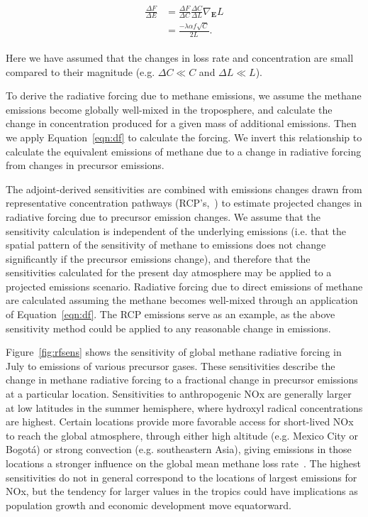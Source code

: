 \begin{equation}
\begin{align}
\begin{split}
\frac{\Delta F}{\Delta E} &= \frac{\Delta F}{\Delta C} \frac{\Delta C}{\Delta L} \nabla_{\mathbf{E}} L \\
                          &= \frac{-\lambda \alpha f \sqrt{C}}{2L}.
\end{split}
\label{eqn:dfde}
\end{align}
\end{equation}

Here we have assumed that the changes in loss rate and concentration are small compared to their magnitude (e.g. $\Delta C \ll C$ and $\Delta L \ll L$).

To derive the radiative forcing due to methane emissions, we assume the methane emissions become globally well-mixed in the troposphere, and calculate the change in concentration produced for a given mass of additional emissions. Then we apply Equation~\ref{eqn:df} to calculate the forcing. We invert this relationship to calculate the equivalent emissions of methane due to a change in radiative forcing from changes in precursor emissions.

The adjoint-derived sensitivities are combined with emissions changes drawn from representative concentration pathways (RCP's,~\citet{ref:lamarque2011,ref:vanvuuren2011}) to estimate projected changes in radiative forcing due to precursor emission changes. We assume that the sensitivity calculation is independent of the underlying emissions (i.e. that the spatial pattern of the sensitivity of methane to emissions does not change significantly if the precursor emissions change), and therefore that the sensitivities calculated for the present day atmosphere may be applied to a projected emissions scenario. Radiative forcing due to direct emissions of methane are calculated assuming the methane becomes well-mixed through an application of Equation~\ref{eqn:df}. The RCP emissions serve as an example, as the above sensitivity method could be applied to any reasonable change in emissions.

Figure~\ref{fig:rfsens} shows the sensitivity of global methane radiative forcing in July to emissions of various precursor gases. These sensitivities describe the change in methane radiative forcing to a fractional change in precursor emissions at a particular location. Sensitivities to anthropogenic NOx are generally larger at low latitudes in the summer hemisphere, where hydroxyl radical concentrations are highest. Certain locations provide more favorable access for short-lived NOx to reach the global atmosphere, through either high altitude (e.g. Mexico City or Bogot\'a) or strong convection (e.g. southeastern Asia), giving emissions in those locations a stronger influence on the global mean methane loss rate~\citep{ref:bowman2012}. The highest sensitivities do not in general correspond to the locations of largest emissions for NOx, but the tendency for larger values in the tropics could have implications as population growth and economic development move equatorward.

